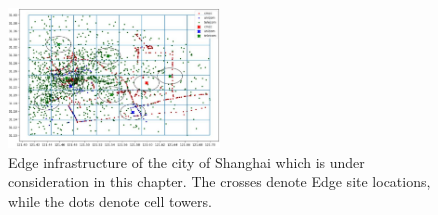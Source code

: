 \begin{figure}
\centering
\includegraphics[width=0.5\textwidth]{figures/mechanisms/shanghai_infrastructure.JPG}
\caption{Edge infrastructure of the city of Shanghai which is under consideration in this chapter. The crosses denote Edge site locations, while the dots denote cell towers. }
\label{fig:shanghai_infra}
\end{figure}

